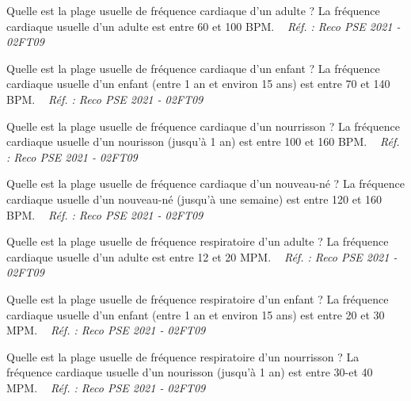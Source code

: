 \documentclass[grid,avery5371,landscape]{flashcards}
\makeatletter
\newcounter{nocarte}
\newcommand{\categ}[1]{%
  \def\@categ{#1}%
  \setcounter{nocarte}{0}%
}
\newcommand{\source}[1]{%
  \medskip
  \itshape%
   ~ \hfill Réf. : #1}
\makeatother
\begin{document}
\color[HTML]{003273}
\categ{PSE}
\begin{flashcard}[bilan]{
 Quelle est la plage usuelle de fréquence cardiaque d'un adulte ?   }
  La fréquence cardiaque usuelle d'un adulte est entre 60 et 100 BPM.
  \source{Reco PSE 2021 - 02FT09}
\end{flashcard}


\color[HTML]{003273}
\categ{PSE}
\begin{flashcard}[bilan]{
 Quelle est la plage usuelle de fréquence cardiaque d'un enfant ?   }
  La fréquence cardiaque usuelle d'un enfant (entre 1 an et environ 15 ans) est entre 70 et 140 BPM.
  \source{Reco PSE 2021 - 02FT09}
\end{flashcard}


\color[HTML]{003273}
\categ{PSE}
\begin{flashcard}[bilan]{
 Quelle est la plage usuelle de fréquence cardiaque d'un nourrisson ?   }
  La fréquence cardiaque usuelle d'un nourisson (jusqu'à 1 an) est entre 100 et 160 BPM.
  \source{Reco PSE 2021 - 02FT09}
\end{flashcard}


\color[HTML]{003273}
\categ{PSE}
\begin{flashcard}[bilan]{
 Quelle est la plage usuelle de fréquence cardiaque d'un nouveau-né ?   }
  La fréquence cardiaque usuelle d'un nouveau-né (jusqu'à une semaine) est entre 120 et 160 BPM.
  \source{Reco PSE 2021 - 02FT09}
\end{flashcard}


\color[HTML]{003273}
\categ{PSE}
\begin{flashcard}[bilan]{
 Quelle est la plage usuelle de fréquence respiratoire d'un adulte ?   }
  La fréquence cardiaque usuelle d'un adulte est entre 12 et 20 MPM.
  \source{Reco PSE 2021 - 02FT09}
\end{flashcard}


\color[HTML]{003273}
\categ{PSE}
\begin{flashcard}[bilan]{
 Quelle est la plage usuelle de fréquence respiratoire d'un enfant ?   }
  La fréquence cardiaque usuelle d'un enfant (entre 1 an et environ 15 ans) est entre 20 et 30 MPM.
  \source{Reco PSE 2021 - 02FT09}
\end{flashcard}


\color[HTML]{003273}
\categ{PSE}
\begin{flashcard}[bilan]{
 Quelle est la plage usuelle de fréquence respiratoire d'un nourrisson ?   }
  La fréquence cardiaque usuelle d'un nourisson (jusqu'à 1 an) est entre 30-et 40 MPM.
  \source{Reco PSE 2021 - 02FT09}
\end{flashcard}
\end{document}
